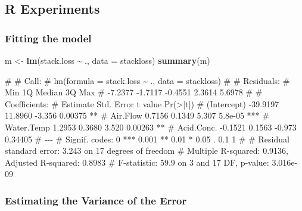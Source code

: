 \documentclass[
  a4paper,
]{article}
\newenvironment{Shaded}{\begin{snugshade}}{\end{snugshade}}
\newcommand{\AttributeTok}[1]{\textcolor[rgb]{0.13,0.29,0.53}{#1}}
\newcommand{\FunctionTok}[1]{\textcolor[rgb]{0.13,0.29,0.53}{\textbf{#1}}}
\newcommand{\NormalTok}[1]{#1}
\newcommand{\OtherTok}[1]{\textcolor[rgb]{0.56,0.35,0.01}{#1}}
\newcommand{\SpecialCharTok}[1]{\textcolor[rgb]{0.81,0.36,0.00}{\textbf{#1}}}
\theoremstyle{definition}
\theoremstyle{definition}
\theoremstyle{definition}
\theoremstyle{definition}
\theoremstyle{remark}
\begin{document}
\subsection{R Experiments}\label{r-experiments}

\subsubsection{Fitting the model}\label{fitting-the-model}

\begin{Shaded}
\begin{Highlighting}[]
\NormalTok{m }\OtherTok{\textless{}{-}} \FunctionTok{lm}\NormalTok{(stack.loss }\SpecialCharTok{\textasciitilde{}}\NormalTok{ ., }\AttributeTok{data =}\NormalTok{ stackloss)}
\FunctionTok{summary}\NormalTok{(m)}
\end{Highlighting}
\end{Shaded}

\begin{Shaded}
\begin{Highlighting}[]
\NormalTok{\# }
\NormalTok{\# Call:}
\NormalTok{\# lm(formula = stack.loss \textasciitilde{} ., data = stackloss)}
\NormalTok{\# }
\NormalTok{\# Residuals:}
\NormalTok{\#     Min      1Q  Median      3Q     Max }
\NormalTok{\# {-}7.2377 {-}1.7117 {-}0.4551  2.3614  5.6978 }
\NormalTok{\# }
\NormalTok{\# Coefficients:}
\NormalTok{\#             Estimate Std. Error t value Pr(\textgreater{}|t|)    }
\NormalTok{\# (Intercept) {-}39.9197    11.8960  {-}3.356  0.00375 ** }
\NormalTok{\# Air.Flow      0.7156     0.1349   5.307  5.8e{-}05 ***}
\NormalTok{\# Water.Temp    1.2953     0.3680   3.520  0.00263 ** }
\NormalTok{\# Acid.Conc.   {-}0.1521     0.1563  {-}0.973  0.34405    }
\NormalTok{\# {-}{-}{-}}
\NormalTok{\# Signif. codes:  0 \textquotesingle{}***\textquotesingle{} 0.001 \textquotesingle{}**\textquotesingle{} 0.01 \textquotesingle{}*\textquotesingle{} 0.05 \textquotesingle{}.\textquotesingle{} 0.1 \textquotesingle{} \textquotesingle{} 1}
\NormalTok{\# }
\NormalTok{\# Residual standard error: 3.243 on 17 degrees of freedom}
\NormalTok{\# Multiple R{-}squared:  0.9136,  Adjusted R{-}squared:  0.8983 }
\NormalTok{\# F{-}statistic:  59.9 on 3 and 17 DF,  p{-}value: 3.016e{-}09}
\end{Highlighting}
\end{Shaded}

\subsubsection{Estimating the Variance of the Error}\label{estimating-the-variance-of-the-error}
\end{document}
